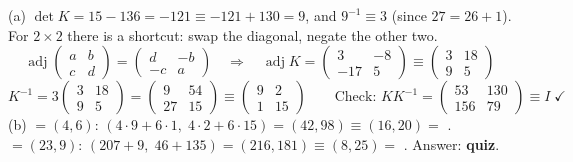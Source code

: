 \ans (a) $\det K = 15 - 136 = -121 \equiv -121 + 130 = 9$, and $9^{-1} \equiv 3$ (since $27 = 26 + 1$).
For $2\times2$ there is a shortcut: swap the diagonal, negate the other two.
\[
\operatorname{adj}\begin{pmatrix}a&b\\c&d\end{pmatrix} = \begin{pmatrix}d&-b\\-c&a\end{pmatrix}
\quad\Rightarrow\quad
\operatorname{adj}K = \begin{pmatrix}3&-8\\-17&5\end{pmatrix} \equiv \begin{pmatrix}3&18\\9&5\end{pmatrix}
\]
\[
K^{-1} = 3\begin{pmatrix}3&18\\9&5\end{pmatrix} = \begin{pmatrix}9&54\\27&15\end{pmatrix} \equiv \boxed{\begin{pmatrix}9&2\\1&15\end{pmatrix}}
\qquad\text{Check: } KK^{-1} = \begin{pmatrix}53&130\\156&79\end{pmatrix} \equiv I \;\checkmark
\]
(b)  $=(4,6)$: $(4\cdot9+6\cdot1,\;4\cdot2+6\cdot15) = (42, 98) \equiv (16, 20) = $ .
 $=(23,9)$: $(207+9,\;46+135) = (216, 181) \equiv (8, 25) = $ . Answer: \textbf{quiz}.

